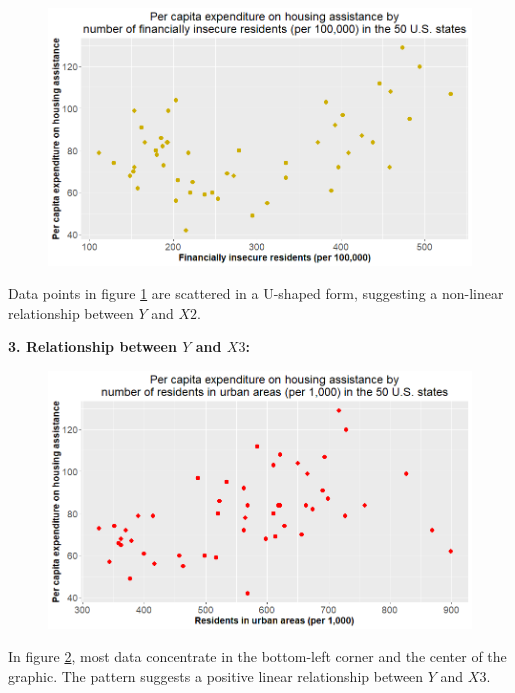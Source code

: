 \documentclass[12pt,letterpaper]{article}
\begin{document}
\begin{itemize}
		\begin{figure}[H]
			\centering
			\caption{}
			\label{yx2}
			\includegraphics[width=0.9\linewidth]{Rplot2}
		\end{figure}
		
		Data points in figure \ref{yx2} are scattered in a U-shaped form, suggesting a non-linear relationship between $Y$ and $X2$.\\
		
		\newpage
		
		\textbf{3. Relationship between $Y$ and $X3$:}

		\vspace{.5cm}

				
		
		\begin{figure}[H]
			\centering
			\caption{}
			\label{yx3}
			\includegraphics[width=0.9\linewidth]{Rplot3}
		\end{figure}
		
		In figure \ref{yx3}, most data concentrate in the bottom-left corner and the center of the graphic. The pattern suggests a positive linear relationship between $Y$ and $X3$.\\
		

\end{itemize}
\end{document}
